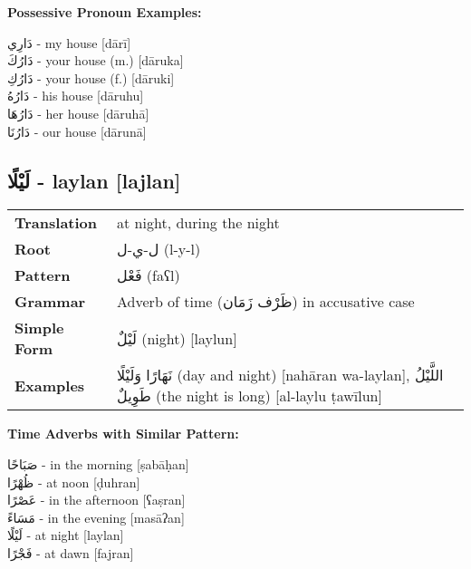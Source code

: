 \documentclass[a4paper,12pt]{article}
\begin{document}
\textbf{Possessive Pronoun Examples:}
\begin{multicols}{2}
\small
\textarabic{دَارِي} - my house [dārī]\\
\textarabic{دَارُكَ} - your house (m.) [dāruka]\\
\textarabic{دَارُكِ} - your house (f.) [dāruki]\\
\textarabic{دَارُهُ} - his house [dāruhu]\\
\textarabic{دَارُهَا} - her house [dāruhā]\\
\textarabic{دَارُنَا} - our house [dārunā]
\end{multicols}

\subsection{\textarabic{لَيْلًا} - \textbf{laylan} [lajlan]}

\begin{tabular}{p{3cm}p{10cm}}
\toprule
\textbf{Translation} & at night, during the night \\
\textbf{Root} & \textarabic{ل-ي-ل} (l-y-l) \\
\textbf{Pattern} & \textarabic{فَعْل} (faʕl) \\
\textbf{Grammar} & Adverb of time (\textarabic{ظَرْف زَمَان}) in accusative case \\
\textbf{Simple Form} & \textarabic{لَيْلٌ} (night) [laylun] \\
\textbf{Examples} & \textarabic{نَهَارًا وَلَيْلًا} (day and night) [nahāran wa-laylan], \textarabic{اللَّيْلُ طَوِيلٌ} (the night is long) [al-laylu ṭawīlun] \\
\bottomrule
\end{tabular}

\textbf{Time Adverbs with Similar Pattern:}
\begin{multicols}{2}
\small
\textarabic{صَبَاحًا} - in the morning [ṣabāḥan]\\
\textarabic{ظُهْرًا} - at noon [ḍuhran]\\
\textarabic{عَصْرًا} - in the afternoon [ʕaṣran]\\
\textarabic{مَسَاءً} - in the evening [masāʔan]\\
\textarabic{لَيْلًا} - at night [laylan]\\
\textarabic{فَجْرًا} - at dawn [fajran]
\end{multicols}

\end{document}
